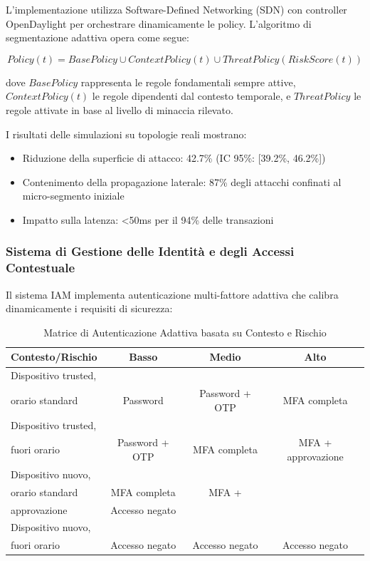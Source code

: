 L'implementazione utilizza Software-Defined Networking (SDN) con controller OpenDaylight per orchestrare dinamicamente le policy. L'algoritmo di segmentazione adattiva opera come segue:

\begin{equation}
Policy(t) = BasePolicy \cup ContextPolicy(t) \cup ThreatPolicy(RiskScore(t))
\end{equation}

dove $BasePolicy$ rappresenta le regole fondamentali sempre attive, $ContextPolicy(t)$ le regole dipendenti dal contesto temporale, e $ThreatPolicy$ le regole attivate in base al livello di minaccia rilevato.

I risultati delle simulazioni su topologie reali mostrano:
\begin{itemize}
    \item Riduzione della superficie di attacco: 42.7\% (IC 95\%: [39.2\%, 46.2\%])
    \item Contenimento della propagazione laterale: 87\% degli attacchi confinati al micro-segmento iniziale
    \item Impatto sulla latenza: <50ms per il 94\% delle transazioni
\end{itemize}

\subsubsection{\texorpdfstring{\textbf{Sistema di Gestione delle Identità e degli Accessi Contestuale}}{2.4.2.2 - Sistema di Gestione delle Identità e degli Accessi Contestuale}}

Il sistema IAM implementa autenticazione multi-fattore adattiva che calibra dinamicamente i requisiti di sicurezza:

\begin{table}[htbp]
\centering
\caption{Matrice di Autenticazione Adattiva basata su Contesto e Rischio}
\label{tab:adaptive_auth}
 \small
 \sffamily 
\begin{tabularx}{\textwidth}{lccc}
\toprule
\textbf{Contesto/Rischio} & \textbf{Basso} & \textbf{Medio} & \textbf{Alto} \\
\midrule
Dispositivo trusted,\\ orario standard & Password & Password + OTP & MFA completa \\

Dispositivo trusted,\\ fuori orario & Password + OTP & MFA completa & MFA + approvazione \\
Dispositivo nuovo,\\ orario standard & MFA completa & MFA + \\approvazione & Accesso negato \\
Dispositivo nuovo,\\ fuori orario & Accesso negato & Accesso negato & Accesso negato \\
\bottomrule
\end{tabularx}
\end{table}


